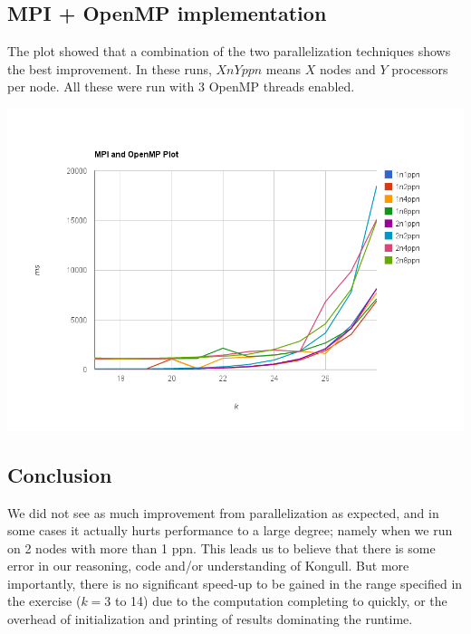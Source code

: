 \documentclass[fontsize=11pt,paper=a4,titlepage]{report}
\begin{document}
\subsection{MPI + OpenMP implementation}

The plot showed that a combination of the two parallelization techniques shows
the best improvement. In these runs, $XnYppn$ means $X$ nodes and $Y$ processors per
node. All these were run with 3 OpenMP threads enabled.

\begin{center}
	\includegraphics[scale=0.45]{chart_3.png}
\end{center}

\subsection{Conclusion}

We did not see as much improvement from parallelization as expected, and in some
cases it actually hurts performance to a large degree; namely when we run on 2
nodes with more than 1 ppn. This leads us to believe that there is some error in
our reasoning, code and/or understanding of Kongull. But more importantly, there
is no significant speed-up to be gained in the range specified in the exercise
($k=3$ to 14) due to the computation completing to quickly, or the overhead of
initialization and printing of results dominating the runtime.
\end{document}
